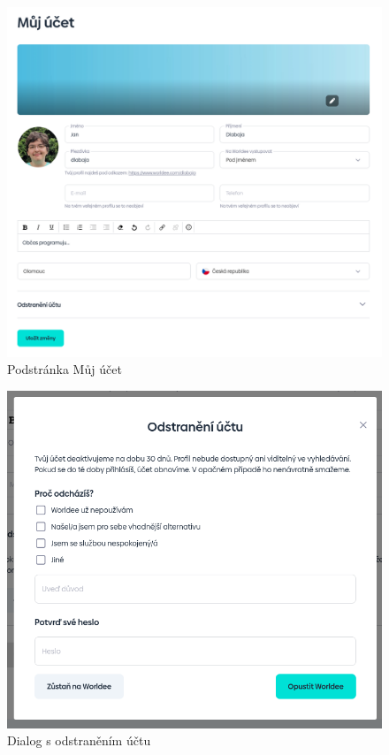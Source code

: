 \begin{figure}
    \centering
    \includegraphics[width=1\linewidth]{obrazky/account.png}
    \caption{Podstránka Můj účet}
\end{figure}

\begin{figure}
    \centering
    \includegraphics[width=1\linewidth]{obrazky/delete_account.png}
    \caption{Dialog s odstraněním účtu}
\end{figure}


